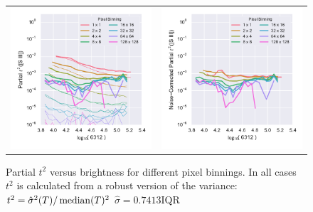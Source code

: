 \documentclass[preprint]{aastex}
\begin{document}
\begin{figure}
\begin{tabular}{@{}c@{}c@{}}
    \includegraphics{muse-tsq-robust-vs-bright-S_III}
    & \includegraphics{muse-corrected-tsq-robust-vs-bright-S_III} \\
  \end{tabular}
  \caption{Partial \(t^2\) versus brightness for different pixel
    binnings.  In all cases \(t^2\) is calculated from a robust
    version of the variance: \(t^2 = \hat{\sigma}^2(T) / \operatorname{median}(T)^2\)
  \(\hat{\sigma} = 0.7413 \mathrm{IQR}\)}
  \label{fig:partial-t2}
\end{figure}
\end{document}
